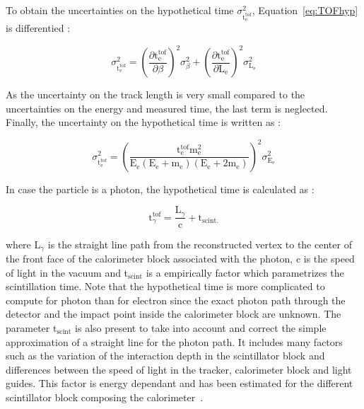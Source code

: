 \documentclass[main.tex]{subfiles}
\begin{document}
\bigskip


\NI To obtain the uncertainties on the hypothetical time $\sigma^\text{2}_{\text{t}_{\text{e}}^{\text{tof}}}$, Equation~\ref{eq:TOFhyp} is differentied : 


\begin{equation}
\sigma^\text{2}_{\text{t}_{\text{e}}^{\text{tof}}} = \left( \frac{\partial \text{t}_\text{e}^{\text{tof}}}{\partial \beta}  \right)^\text{2} \sigma^\text{2}_\beta + \left( \frac{\partial \text{t}_\text{e}^{\text{tof}}}{\partial \text{L}_\text{e}}  \right)^\text{2} \sigma^\text{2}_{\text{L}_\text{e}}
\end{equation}


\bigskip


\NI As the uncertainty on the track length is very small compared to the uncertainties on the energy and measured time, the last term is neglected. Finally, the uncertainty on the hypothetical time is written as : 


\begin{equation}
\sigma^\text{2}_{\text{t}_{\text{e}}^{\text{tof}}} = \left( \frac{\text{t}_\text{e}^{\text{tof}} \text{m}_\text{e}^\text{2}}{\text{E}_\text{e} (\text{E}_\text{e} + \text{m}_\text{e})(\text{E}_\text{e} + \text{2m}_\text{e})}  \right) ^\text{2} \sigma^\text{2}_{\text{E}_\text{e}}
\end{equation}


\bigskip


\NI In case the particle is a photon, the hypothetical time is calculated as : 


\begin{equation}
\text{t}_\gamma^{\text{tof}} = \frac{\text{L}_\gamma}{\text{c}} + \text{t}_{\text{scint.}} 
\end{equation}

\bigskip


\NI where L$_{\gamma}$ is the straight line path from the reconstructed vertex to the center of the front face of the calorimeter block associated with the photon, c is the speed of light in the vacuum and t$_{\text{scint}}$ is a empirically factor which parametrizes the scintillation time. Note that the hypothetical time is more complicated to compute for photon than for electron since the exact photon path through the detector and the impact point inside the calorimeter block are unknown. The parameter t$_{\text{scint}}$ is also present to take into account and correct the simple approximation of a straight line for the photon path. It includes many factors such as the variation of the interaction depth in the scintillator block and differences between the speed of light in the tracker, calorimeter block and light guides. This factor is energy dependant and has been estimated for the different scintillator block composing the calorimeter~\cite{GammaReconstructionHereward}.
\end{document}
